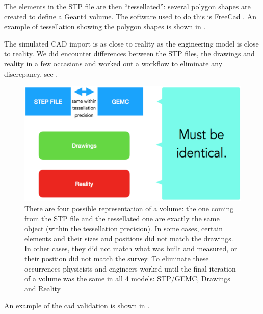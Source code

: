 The elements in the STP file are then ``tessellated'': several polygon shapes are created to define a Geant4 volume.
The software used to do this is FreeCad \cite{freeCad}. An example of tessellation showing the polygon shapes
is shown in .

The simulated CAD import is as close to reality as the engineering model is close to reality.
We did encounter differences between the STP files, the drawings and reality in a few occasions and worked
out a workflow to eliminate any discrepancy, see .


\begin{figure}
	\centering
	\includegraphics[width=0.95\columnwidth,keepaspectratio]{img/cadValidation.png}
	\caption{There are four possible representation of a volume: the one coming from the STP file
             and the tessellated one are exactly the same object (within the tessellation precision).
             In some cases, certain elements and their sizes and positions did not match the drawings.
             In other cases, they did not match what was built and measured, or their position did not
             match the survey. To eliminate these occurrences physicists and engineers worked until
             the final iteration of a volume was the same in all 4 models: STP/GEMC, Drawings and Reality}
	\label{fig:cadValidation}
\end{figure}

An example of the cad validation is shown in .


